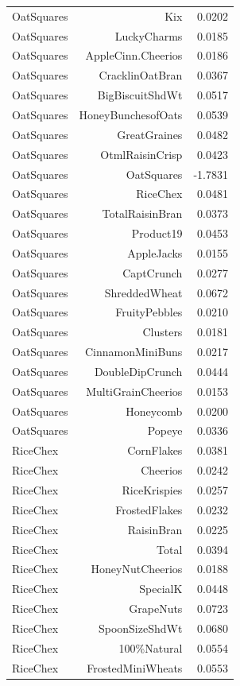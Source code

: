 \begin{longtable}{@{}lrr@{}}
OatSquares & Kix & 0.0202 \\
OatSquares & LuckyCharms & 0.0185 \\
OatSquares & AppleCinn.Cheerios & 0.0186 \\
OatSquares & CracklinOatBran & 0.0367 \\
OatSquares & BigBiscuitShdWt & 0.0517 \\
OatSquares & HoneyBunchesofOats & 0.0539 \\
OatSquares & GreatGraines & 0.0482 \\
OatSquares & OtmlRaisinCrisp & 0.0423 \\
OatSquares & OatSquares & -1.7831 \\
OatSquares & RiceChex & 0.0481 \\
OatSquares & TotalRaisinBran & 0.0373 \\
OatSquares & Product19 & 0.0453 \\
OatSquares & AppleJacks & 0.0155 \\
OatSquares & CaptCrunch & 0.0277 \\
OatSquares & ShreddedWheat & 0.0672 \\
OatSquares & FruityPebbles & 0.0210 \\
OatSquares & Clusters & 0.0181 \\
OatSquares & CinnamonMiniBuns & 0.0217 \\
OatSquares & DoubleDipCrunch & 0.0444 \\
OatSquares & MultiGrainCheerios & 0.0153 \\
OatSquares & Honeycomb & 0.0200 \\
OatSquares & Popeye & 0.0336 \\
RiceChex & CornFlakes & 0.0381 \\
RiceChex & Cheerios & 0.0242 \\
RiceChex & RiceKrispies & 0.0257 \\
RiceChex & FrostedFlakes & 0.0232 \\
RiceChex & RaisinBran & 0.0225 \\
RiceChex & Total & 0.0394 \\
RiceChex & HoneyNutCheerios & 0.0188 \\
RiceChex & SpecialK & 0.0448 \\
RiceChex & GrapeNuts & 0.0723 \\
RiceChex & SpoonSizeShdWt & 0.0680 \\
RiceChex & 100\%Natural & 0.0554 \\
RiceChex & FrostedMiniWheats & 0.0553 \\

\end{longtable}
